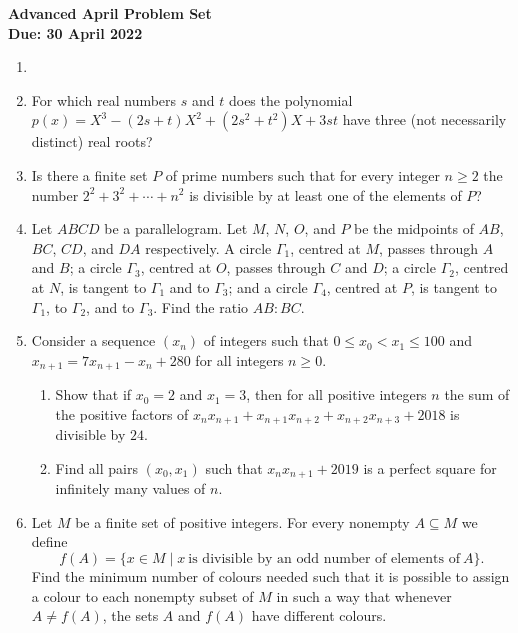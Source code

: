 \documentclass{article}
\begin{document}
\thispagestyle{empty}

\begin{center}
  \textbf{\Large Advanced April Problem Set}
  \\ \vspace{1em}
  \textbf{\large Due: 30 April 2022}
\end{center}

\bigskip

\begin{enumerate}[itemsep=12pt]

\item %


\item %
For which real numbers $s$ and $t$ does the polynomial $p(x) = X^3 -(2s+t)X^2 +(2s^2+t^2)X +3st$ have three (not necessarily distinct) real roots?


\item %
Is there a finite set $P$ of prime numbers such that for every integer $n \geq 2$ the number $2^2 +3^2 +\dotsb +n^2$ is divisible by at least one of the elements of $P$?


\item %
Let $ABCD$ be a parallelogram.
Let $M$, $N$, $O$, and $P$ be the midpoints of $AB$, $BC$, $CD$, and $DA$ respectively.
A circle $\Gamma_1$, centred at $M$, passes through $A$ and $B$; a circle $\Gamma_3$, centred at $O$, passes through $C$ and $D$; a circle $\Gamma_2$, centred at $N$, is tangent to $\Gamma_1$ and to $\Gamma_3$; and a circle $\Gamma_4$, centred at $P$, is tangent to $\Gamma_1$, to $\Gamma_2$, and to $\Gamma_3$.
Find the ratio $AB:BC$.


\item %
Consider a sequence $(x_n)$ of integers such that $0 \leq x_0 < x_1 \leq 100$ and $x_{n+1} = 7x_{n+1} -x_n +280$ for all integers $n \geq 0$.
\begin{enumerate}
	\item Show that if $x_0 = 2$ and $x_1 = 3$, then for all positive integers $n$ the sum of the positive factors of $x_n x_{n+1} +x_{n+1}x_{n+2} +x_{n+2}x_{n+3} +2018$ is divisible by $24$.
	\item Find all pairs $(x_0,x_1)$ such that $x_n x_{n+1} +2019$ is a perfect square for infinitely many values of $n$.
\end{enumerate}


\item %
Let $M$ be a finite set of positive integers.
For every nonempty $A \subseteq M$ we define
\[ f(A) = \{x \in M \mid x \ \text{is divisible by an odd number of elements of} \ A\}. \]
Find the minimum number of colours needed such that it is possible to assign a colour to each nonempty subset of $M$ in such a way that whenever $A \neq f(A)$, the sets $A$ and $f(A)$ have different colours.

\end{enumerate}
\end{document}
